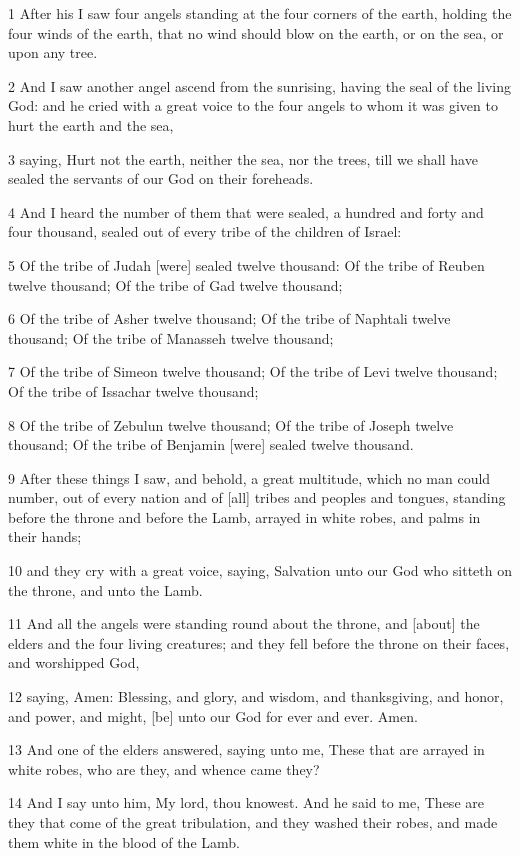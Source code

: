 \par 1 After his I saw four angels standing at the four corners of the earth, holding the four winds of the earth, that no wind should blow on the earth, or on the sea, or upon any tree.
\par 2 And I saw another angel ascend from the sunrising, having the seal of the living God: and he cried with a great voice to the four angels to whom it was given to hurt the earth and the sea,
\par 3 saying, Hurt not the earth, neither the sea, nor the trees, till we shall have sealed the servants of our God on their foreheads.
\par 4 And I heard the number of them that were sealed, a hundred and forty and four thousand, sealed out of every tribe of the children of Israel:
\par 5 Of the tribe of Judah [were] sealed twelve thousand: Of the tribe of Reuben twelve thousand; Of the tribe of Gad twelve thousand;
\par 6 Of the tribe of Asher twelve thousand; Of the tribe of Naphtali twelve thousand; Of the tribe of Manasseh twelve thousand;
\par 7 Of the tribe of Simeon twelve thousand; Of the tribe of Levi twelve thousand; Of the tribe of Issachar twelve thousand;
\par 8 Of the tribe of Zebulun twelve thousand; Of the tribe of Joseph twelve thousand; Of the tribe of Benjamin [were] sealed twelve thousand.
\par 9 After these things I saw, and behold, a great multitude, which no man could number, out of every nation and of [all] tribes and peoples and tongues, standing before the throne and before the Lamb, arrayed in white robes, and palms in their hands;
\par 10 and they cry with a great voice, saying, Salvation unto our God who sitteth on the throne, and unto the Lamb.
\par 11 And all the angels were standing round about the throne, and [about] the elders and the four living creatures; and they fell before the throne on their faces, and worshipped God,
\par 12 saying, Amen: Blessing, and glory, and wisdom, and thanksgiving, and honor, and power, and might, [be] unto our God for ever and ever. Amen.
\par 13 And one of the elders answered, saying unto me, These that are arrayed in white robes, who are they, and whence came they?
\par 14 And I say unto him, My lord, thou knowest. And he said to me, These are they that come of the great tribulation, and they washed their robes, and made them white in the blood of the Lamb.
